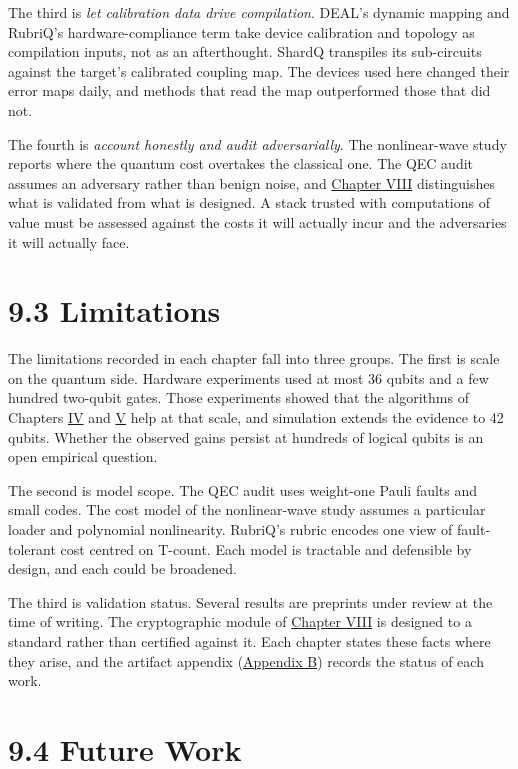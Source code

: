 \documentclass{report}
\theoremstyle{plain}
\theoremstyle{definition}
\theoremstyle{remark}
\begin{document}
The third is \emph{let calibration data drive compilation}. DEAL's dynamic mapping and RubriQ's hardware-compliance term take device calibration and topology as compilation inputs, not as an afterthought. ShardQ transpiles its sub-circuits against the target's calibrated coupling map. The devices used here changed their error maps daily, and methods that read the map outperformed those that did not.

The fourth is \emph{account honestly and audit adversarially}. The nonlinear-wave study reports where the quantum cost overtakes the classical one. The QEC audit assumes an adversary rather than benign noise, and \hyperref[ch:pqc]{Chapter VIII} distinguishes what is validated from what is designed. A stack trusted with computations of value must be assessed against the costs it will actually incur and the adversaries it will actually face.

\section{9.3 Limitations}\label{sec:conclusion:limitations}

The limitations recorded in each chapter fall into three groups. The first is scale on the quantum side. Hardware experiments used at most 36 qubits and a few hundred two-qubit gates. Those experiments showed that the algorithms of Chapters \hyperref[ch:qml]{IV} and \hyperref[ch:nisq]{V} help at that scale, and simulation extends the evidence to 42 qubits. Whether the observed gains persist at hundreds of logical qubits is an open empirical question.

The second is model scope. The QEC audit uses weight-one Pauli faults and small codes. The cost model of the nonlinear-wave study assumes a particular loader and polynomial nonlinearity. RubriQ's rubric encodes one view of fault-tolerant cost centred on T-count. Each model is tractable and defensible by design, and each could be broadened.

The third is validation status. Several results are preprints under review at the time of writing. The cryptographic module of \hyperref[ch:pqc]{Chapter VIII} is designed to a standard rather than certified against it. Each chapter states these facts where they arise, and the artifact appendix (\hyperref[app:repro]{Appendix B}) records the status of each work.

\section{9.4 Future Work}\label{sec:conclusion:future}
\end{document}
